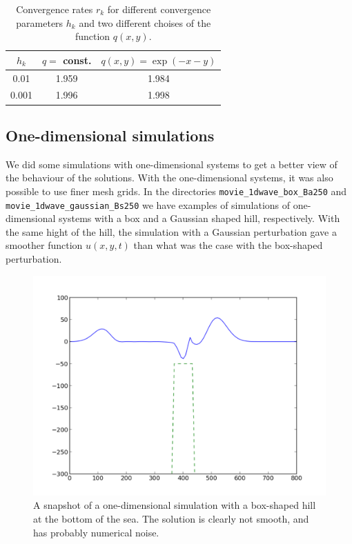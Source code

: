 \documentclass[twoside]{article}
\begin{document}
  \begin{table} \label{tab:conv}
    \begin{center}
      \caption{Convergence rates $r_{k}$ for different convergence parameters $h_{k}$ and two different choises of the function $q(x, y)$.}
      \begin{tabular}{ccc}
        \hline\hline
        $h_{k}$ & $q = $ const. & $q(x, y) = \exp(-x-y)$ \\
        \hline
        0.01 & 1.959 & 1.984 \\
        0.001 & 1.996 & 1.998 \\
        \hline\hline

      \end{tabular}
    \end{center}
  \end{table}

  \subsection{One-dimensional simulations}
  
  We did some simulations with one-dimensional systems to get a better view of 
  the behaviour of the solutions. With the one-dimensional systems, it was also possible to use finer mesh grids. In the directories \verb+movie_1dwave_box_Ba250+ and \verb+movie_1dwave_gaussian_Bs250+ we have examples of simulations of one-dimensional systems with a box and a Gaussian shaped hill, respectively. With the same hight of the hill, the simulation with a Gaussian perturbation gave a smoother function $u(x, y, t)$ than what was the case with the box-shaped perturbation.  

\begin{figure} 
  \centering
  \includegraphics[scale=0.4]{gustavs_codes/movie_1dwave_box_Ba250/figure.pdf}
  \caption{A snapshot of a one-dimensional simulation with a box-shaped hill at the bottom of the sea. The solution is clearly not smooth, and has probably numerical noise.} %
\end{figure}
\end{document}
